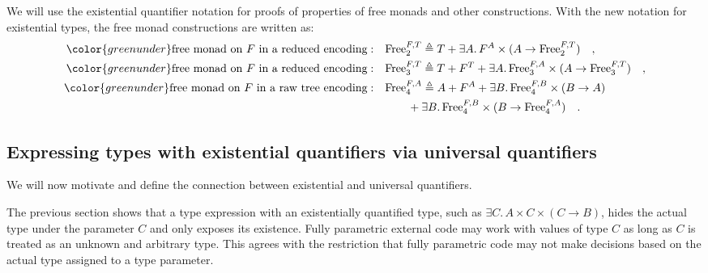 We will use the existential quantifier notation for proofs of properties
of free monads and other constructions. With the new notation for
existential types, the free monad constructions are written as:
\begin{align*}
{\color{greenunder}\text{free monad on }F\text{ in a reduced encoding}:}\quad & \text{Free}_{2}^{F,T}\triangleq T+\exists A.\,F^{A}\times(A\rightarrow\text{Free}_{2}^{F,T})\quad,\\
{\color{greenunder}\text{free monad on }F\text{ in a reduced encoding}:}\quad & \text{Free}_{3}^{F,T}\triangleq T+F^{T}+\exists A.\,\text{Free}_{3}^{F,A}\times(A\rightarrow\text{Free}_{3}^{F,T})\quad,\\
{\color{greenunder}\text{free monad on }F\text{ in a raw tree encoding}:}\quad & \text{Free}_{4}^{F,A}\triangleq A+F^{A}+\exists B.\,\text{Free}_{4}^{F,B}\times(B\rightarrow A)\\
 & \quad\quad+\exists B.\,\text{Free}_{4}^{F,B}\times(B\rightarrow\text{Free}_{4}^{F,A})\quad.
\end{align*}


\subsection{Expressing types with existential quantifiers via universal quantifiers}

We will now motivate and define the connection between existential
and universal quantifiers.

The previous section shows that a type expression with an existentially
quantified type, such as $\exists C.\,A\times C\times\left(C\rightarrow B\right)$,
hides the actual type under the parameter $C$ and only exposes its
existence. Fully parametric external
code may work with values of type $C$ as long as $C$ is treated
as an unknown and arbitrary type. This agrees with the restriction
that fully parametric code may not make decisions based on the actual
type assigned to a type parameter.

